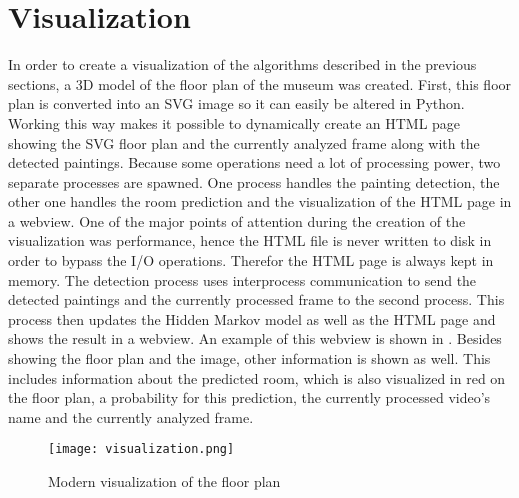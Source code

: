 \section{Visualization}

In order to create a visualization of the algorithms described in the previous sections, a 3D model of the floor plan of the museum was created. First, this floor plan is converted into an SVG image so it can easily be altered in Python. Working this way makes it possible to dynamically create an HTML page showing the SVG floor plan and the currently analyzed frame along with the detected paintings. Because some operations need a lot of processing power, two separate processes are spawned. One process handles the painting detection, the other one handles the room prediction and the visualization of the HTML page in a webview. One of the major points of attention during the creation of the visualization was performance, hence the HTML file is never written to disk in order to bypass the I/O operations. Therefor the HTML page is always kept in memory. The detection process uses interprocess communication to send the detected paintings and the currently processed frame to the second process. This process then updates the Hidden Markov model as well as the HTML page and shows the result in a webview. An example of this webview is shown in . Besides showing the floor plan and the image, other information is shown as well. This includes information about the predicted room, which is also visualized in red on the floor plan, a probability for this prediction, the currently processed video's name and the currently analyzed frame.

\begin{figure}
    \centering
    \texttt{[image: visualization.png]}
    \label{fig:webview}
    \caption{Modern visualization of the floor plan}
\end{figure}

